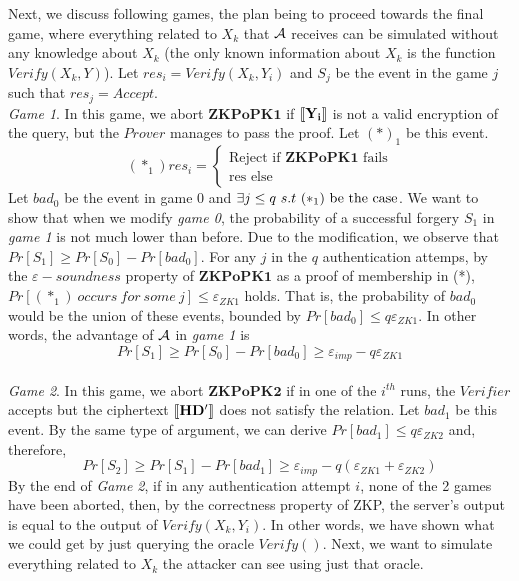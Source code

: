 Next, we discuss following games, the plan being to proceed towards the final
game, where everything related to $X_k$ that $\mathcal{A}$ receives can be simulated
without any knowledge about $X_k$ (the only known information about $X_k$ is the
function $Verify(X_k, Y)$). Let $res_i = Verify(X_k, Y_{i})$ and $S_j$ be
the event in the game $j$ such that $res_j = Accept$.\\
\textit{Game 1}. In this game, we abort $\mathbf{ZKPoPK1}$ if $\left\llbracket\mathbf{Y_{i}}\right\rrbracket$ is
not a valid encryption of the query, but the $Prover$ manages to pass the
proof. Let $(*)_1$ be this event.
\[
  (*_1)res_i = \begin{cases}
    \text{Reject if } \mathbf{ZKPoPK1} \text{ fails}\\
    \text{res else}
  \end{cases}
\]
Let $bad_0$ be the event in game 0 and
$\exists j \leq q\ s.t\ (*_1)\ \textnormal{be the case}$. We want to show that
when we modify \textit{game 0}, the probability of a successful forgery $S_1$ in
\textit{game 1} is not much lower than before. Due to the modification, we
observe that $ Pr[S_1] \geq Pr[S_0] - Pr[bad_0] $. For any $j$ in the $q$
authentication attemps, by the $\varepsilon-soundness$ property of
$\mathbf{ZKPoPK1}$ as a proof of membership in (*),
$Pr[(*_1)\ occurs\ for\ some \ j] \leq \varepsilon_{ZK1}$ holds. That is, the
probability of $bad_0$ would be the union of these events, bounded by
$Pr[bad_0] \leq q\varepsilon_{ZK1}$. In other words, the advantage of
$\mathcal{A}$ in \textit{game 1} is
\[
  Pr[S_1] \geq Pr[S_0] - Pr[bad_0] \geq \varepsilon_{imp} - q\varepsilon_{ZK1}
\]
\\
\textit{Game 2}. In this game, we abort $\mathbf{ZKPoPK2}$ if in one of the
$i^{th}$ runs, the $Verifier$ accepts but the ciphertext $\left\llbracket\mathbf{HD'}\right\rrbracket$
does not satisfy the relation. Let $bad_1$ be this event. By the same type of
argument, we can derive $Pr[bad_1] \leq q\varepsilon_{ZK2}$ and, therefore,
$$Pr[S_2] \geq Pr[S_1]
- Pr[bad_1] \geq \varepsilon_{imp} - q(\varepsilon_{ZK1}+\varepsilon_{ZK2})
$$
By the end of \textit{Game 2}, if in any authentication attempt $i$, none of the
2 games have been aborted, then, by the correctness property of ZKP, the
server's output is equal to the output of $Verify(X_k, Y_{i})$. In other words,
we have shown what we could get by just querying the oracle $Verify()$. Next, we
want to simulate everything related to $X_k$ the attacker
can see using just that oracle.\\

